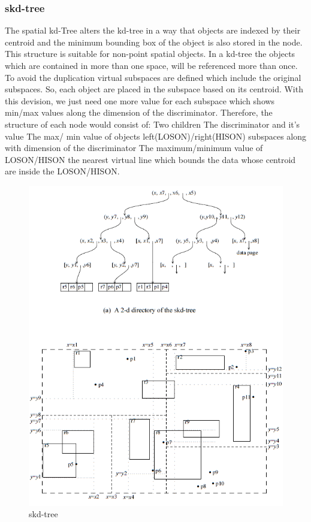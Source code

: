 \documentclass[a4paper,12pt]{article}
\begin{document}
\subsubsection{skd-tree}
The spatial kd-Tree alters the kd-tree in a way that objects are indexed by their centroid and the minimum bounding box of the object is also stored in the node. This structure is suitable for non-point spatial objects. In a kd-tree the objects which are contained in more than one space, will be referenced more than once. To avoid the duplication virtual subspaces are defined which include the original subspaces. So, each object are placed in the subspace based on its centroid.
With this devision, we just need one more value for each subspace which shows min/max values along the dimension of the discriminator. Therefore, the structure of each node would consist of:
Two children
The discriminator and it's value
The max/ min value of objects left(LOSON)/right(HISON) subspaces along with dimension of the discriminator
The maximum/minimum value of LOSON/HISON the nearest virtual line which bounds the data whose centroid are inside the LOSON/HISON.

\begin{figure}
\centering
\includegraphics[width=\textwidth]{skdtree}
\caption{skd-tree}
\label{fig1}
\end{figure}
\end{document}
